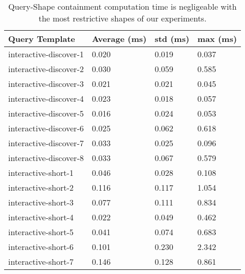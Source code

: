 \begin{table}
	\begin{center}
		\begin{tabular}{|l|l|l|l|}
			\hline
			Query Template & Average (ms) & std (ms) & max (ms) \\
			\hline
			interactive-discover-1 & 0.020 & 0.019 & 0.037 \\
			\hline
			interactive-discover-2 & 0.030 & 0.059 & 0.585 \\
			\hline
			interactive-discover-3 & 0.021 & 0.021 & 0.045 \\
			\hline
			interactive-discover-4 & 0.023 & 0.018 & 0.057 \\
			\hline
			interactive-discover-5 & 0.016 & 0.024 & 0.053 \\
			\hline
			interactive-discover-6 & 0.025 & 0.062 & 0.618 \\
			\hline
			interactive-discover-7 & 0.033 & 0.025 & 0.096 \\
			\hline
			interactive-discover-8 & 0.033 & 0.067 & 0.579 \\
			\hline
			interactive-short-1 & 0.046 & 0.028 & 0.108 \\
			\hline
			interactive-short-2 & 0.116 & 0.117 & 1.054 \\
			\hline
			interactive-short-3 & 0.077 & 0.111 & 0.834 \\
			\hline
			interactive-short-4 & 0.022 & 0.049 & 0.462 \\
			\hline
			interactive-short-5 & 0.041 & 0.074 & 0.683 \\
			\hline
			interactive-short-6 & 0.101 & 0.230 & 2.342 \\
			\hline
			interactive-short-7 & 0.146 & 0.128 & 0.861 \\
			\hline
		\end{tabular}
	\end{center}
	\caption{Query-Shape containment computation time is negligeable with the most restrictive shapes of our experiments.}
	\label{tab:queryShapeContainmentEval}
\end{table}